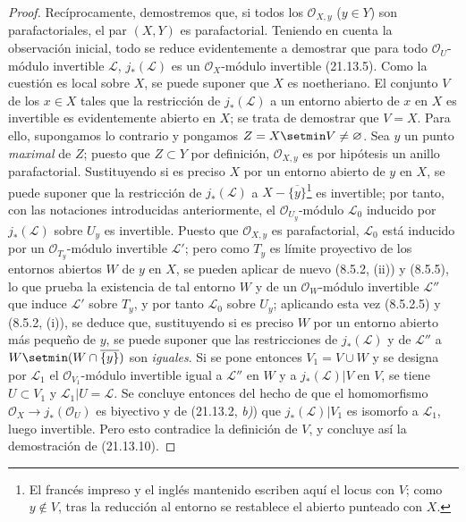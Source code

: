 \begin{proof}
Recíprocamente, demostremos que, si todos los $\mathcal O_{X,y}$ ($y\in Y$) son
parafactoriales, el par $(X,Y)$ es parafactorial. Teniendo en cuenta la observación
inicial, todo se reduce evidentemente a demostrar que para todo $\mathcal O_U$-módulo invertible
$\mathscr L$, $j_*(\mathscr L)$ es un $\mathcal O_X$-módulo invertible (21.13.5).
Como la cuestión es local sobre $X$, se puede suponer que $X$ es noetheriano. El conjunto $V$ de los
$x\in X$ tales que la restricción de $j_*(\mathscr L)$ a un entorno abierto de $x$
en $X$ es invertible es evidentemente abierto en $X$; se trata de demostrar que
$V=X$. Para ello, supongamos lo contrario y pongamos $Z=X\setmin V\neq\varnothing$. Sea $y$
un punto \emph{maximal} de $Z$; puesto que $Z\subset Y$ por definición,
$\mathcal O_{X,y}$ es por hipótesis un anillo parafactorial. Sustituyendo si es preciso
$X$ por un entorno abierto de $y$ en $X$, se puede suponer que la restricción de
$j_*(\mathscr L)$
a $X-\overline{\{y\}}$\footnote{El francés impreso y el inglés mantenido escriben aquí el locus con $V$; como $y\notin V$, tras la reducción
al entorno se restablece el abierto punteado con $X$.} es invertible; por tanto, con las notaciones introducidas
anteriormente, el $\mathcal O_{U_y}$-módulo $\mathscr L_0$ inducido por $j_*(\mathscr L)$
sobre $U_y$ es invertible. Puesto que $\mathcal O_{X,y}$ es parafactorial,
$\mathscr L_0$ está inducido por un $\mathcal O_{T_y}$-módulo invertible $\mathscr L'$;
pero como $T_y$ es límite proyectivo de los entornos abiertos $W$ de $y$ en $X$,
se pueden aplicar de nuevo (8.5.2, (ii)) y (8.5.5), lo que prueba la existencia de tal
entorno $W$ y de un $\mathcal O_W$-módulo invertible $\mathscr L''$ que induce
$\mathscr L'$ sobre $T_y$, y por tanto $\mathscr L_0$ sobre $U_y$; aplicando esta
vez (8.5.2.5) y (8.5.2, (i)), se deduce que, sustituyendo si es preciso $W$ por un
entorno abierto más pequeño de $y$, se puede suponer que las restricciones de
$j_*(\mathscr L)$ y de $\mathscr L''$ a
$W\setmin(W\cap\overline{\{y\}})$ son \emph{iguales}. Si se pone entonces $V_1=V\cup W$ y se
designa por $\mathscr L_1$ el $\mathcal O_{V_1}$-módulo invertible igual a
$\mathscr L''$ en $W$ y a $j_*(\mathscr L)|V$ en $V$, se tiene $U\subset V_1$ y
$\mathscr L_1|U=\mathscr L$. Se concluye entonces del hecho de que el homomorfismo
$\mathcal O_X\to j_*(\mathcal O_U)$ es biyectivo y de (21.13.2, \emph{b)}) que
$j_*(\mathscr L)|V_1$ es isomorfo a $\mathscr L_1$, luego invertible. Pero esto
contradice la definición de $V$, y concluye así la demostración de (21.13.10).
\end{proof}


